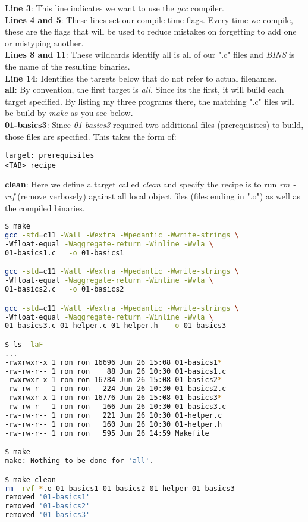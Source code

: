 \documentclass[../main.tex]{subfiles}
\begin{document}
\textbf{Line 3}: This line indicates we want to use the \textit{gcc} compiler.\\
\textbf{Lines 4 and 5}: These lines set our compile time flags.  Every time we compile, these are the flags that will be used to reduce mistakes on forgetting to add one or mistyping another.\\
\textbf{Lines 8 and 11}: These wildcards identify all is all of our ".c" files and \textit{BINS} is the name of the resulting binaries.\\
\textbf{Line 14}: Identifies the targets below that do not refer to actual filenames.\\
\textbf{all}: By convention, the first target is \textit{all}.  Since its the first, it will build each target specified.  By listing my three programs there, the matching ".c" files will be build by \textit{make} as you see below.\\
\textbf{01-basics3}: Since \textit{01-basics3} required two additional files (prerequisites) to build, those files are specified.  This takes the form of:
\begin{verbatim}
target: prerequisites
<TAB> recipe
\end{verbatim}

\textbf{clean}: Here we define a target called \textit{clean} and specify the recipe is to run \textit{rm -rvf} (remove verbosely) against all local object files (files ending in ".o") as well as the compiled binaries.\\
\begin{lstlisting}[language=bash, numbers=none]
$ make
gcc -std=c11 -Wall -Wextra -Wpedantic -Wwrite-strings \
-Wfloat-equal -Waggregate-return -Winline -Wvla \
01-basics1.c   -o 01-basics1

gcc -std=c11 -Wall -Wextra -Wpedantic -Wwrite-strings \
-Wfloat-equal -Waggregate-return -Winline -Wvla \
01-basics2.c   -o 01-basics2

gcc -std=c11 -Wall -Wextra -Wpedantic -Wwrite-strings \
-Wfloat-equal -Waggregate-return -Winline -Wvla \
01-basics3.c 01-helper.c 01-helper.h   -o 01-basics3

$ ls -laF
...
-rwxrwxr-x 1 ron ron 16696 Jun 26 15:08 01-basics1*
-rw-rw-r-- 1 ron ron    88 Jun 26 10:30 01-basics1.c
-rwxrwxr-x 1 ron ron 16784 Jun 26 15:08 01-basics2*
-rw-rw-r-- 1 ron ron   224 Jun 26 10:30 01-basics2.c
-rwxrwxr-x 1 ron ron 16776 Jun 26 15:08 01-basics3*
-rw-rw-r-- 1 ron ron   166 Jun 26 10:30 01-basics3.c
-rw-rw-r-- 1 ron ron   221 Jun 26 10:30 01-helper.c
-rw-rw-r-- 1 ron ron   160 Jun 26 10:30 01-helper.h
-rw-rw-r-- 1 ron ron   595 Jun 26 14:59 Makefile

$ make
make: Nothing to be done for 'all'.

$ make clean
rm -rvf *.o 01-basics1 01-basics2 01-helper 01-basics3
removed '01-basics1'
removed '01-basics2'
removed '01-basics3'
\end{lstlisting}
\end{document}
